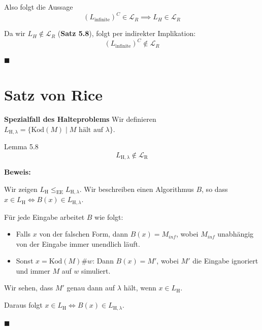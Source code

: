 \documentclass[a4paper, 11pt]{article}
\def\L{\mathcal{L}}
\def\Lr{\mathcal{L}_\text{R}}
\newcommand\myTitle[1]{{\large \textbf {#1}}}
\begin{document}
                    Also folgt die Aussage
                    $$(L_{\text{infinite}})^C \in \L_R \implies L_H \in \L_R$$
                
                    Da wir $L_H \notin \L_R$ (\textbf{Satz 5.8}), folgt per indirekter Implikation:
                    $$(L_{\text{infinite}})^C \notin \L_R$$
                
                    \hspace*{0pt}\hfill$\blacksquare$
                
                \section{Satz von Rice}
                
                
                    \myTitle{Spezialfall des Halteproblems}
                    Wir definieren $L_{\text{H}, \lambda} = \{\text{Kod}(M) \mid M \text{ hält auf }\lambda\}$.
                    \begin{mainbox}{Lemma 5.8}
                        $$L_{\text{H}, \lambda} \notin \Lr$$
                    \end{mainbox}
                    \textbf{Beweis: }
                
                    Wir zeigen $L_\text{H} \leq_\text{EE} L_{\text{H}, \lambda}$. Wir beschreiben einen Algorithmus $B$, so dass $x \in L_\text{H} \iff B(x) \in L_{\text{H}, \lambda}$.
                
                    Für jede Eingabe arbeitet $B$ wie folgt:
                    \begin{itemize}
                        \item Falls $x$ von der falschen Form, dann $B(x) = M_{inf}$, wobei $M_{inf}$ unabhängig von der Eingabe immer unendlich läuft.
                        \item Sonst $x = \text{Kod}(M)\#w$: Dann $B(x) = M'$, wobei $M'$ die Eingabe ignoriert und immer $M$ auf $w$ simuliert.
                    \end{itemize}
                
                    Wir sehen, dass $M'$ genau dann auf $\lambda$ hält, wenn $x \in L_{\text{H}}$.
                
                    Daraus folgt $x \in L_\text{H} \iff B(x) \in L_{\text{H}, \lambda}$.
                
                    \hspace*{0pt}\hfill$\blacksquare$
                
\end{document}
